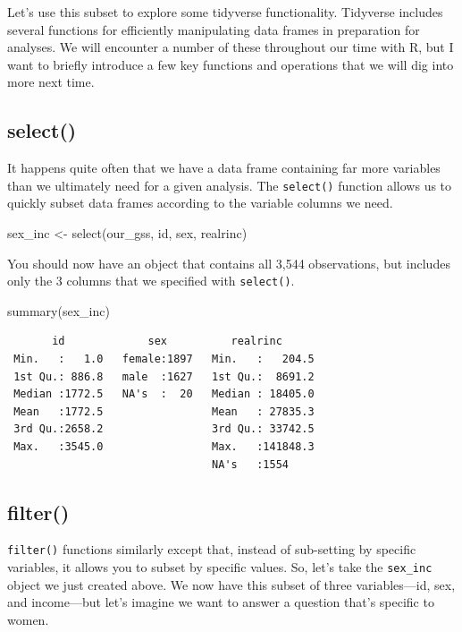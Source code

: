 \documentclass[
  letterpaper,
  DIV=11,
  numbers=noendperiod]{scrreprt}
\newenvironment{Shaded}{\begin{snugshade}}{\end{snugshade}}
\newcommand{\FunctionTok}[1]{\textcolor[rgb]{0.28,0.35,0.67}{#1}}
\newcommand{\NormalTok}[1]{\textcolor[rgb]{0.00,0.23,0.31}{#1}}
\newcommand{\OtherTok}[1]{\textcolor[rgb]{0.00,0.23,0.31}{#1}}
\begin{document}
Let's use this subset to explore some tidyverse functionality. Tidyverse
includes several functions for efficiently manipulating data frames in
preparation for analyses. We will encounter a number of these throughout
our time with R, but I want to briefly introduce a few key functions and
operations that we will dig into more next time.

\subsection{select()}\label{select}

It happens quite often that we have a data frame containing far more
variables than we ultimately need for a given analysis. The
\texttt{select()} function allows us to quickly subset data frames
according to the variable columns we need.

\begin{Shaded}
\begin{Highlighting}[]
\NormalTok{sex\_inc }\OtherTok{\textless{}{-}} \FunctionTok{select}\NormalTok{(our\_gss, id, sex, realrinc)}
\end{Highlighting}
\end{Shaded}

You should now have an object that contains all 3,544 observations, but
includes only the 3 columns that we specified with \texttt{select()}.

\begin{Shaded}
\begin{Highlighting}[]
\FunctionTok{summary}\NormalTok{(sex\_inc)}
\end{Highlighting}
\end{Shaded}

\begin{verbatim}
       id             sex          realrinc       
 Min.   :   1.0   female:1897   Min.   :   204.5  
 1st Qu.: 886.8   male  :1627   1st Qu.:  8691.2  
 Median :1772.5   NA's  :  20   Median : 18405.0  
 Mean   :1772.5                 Mean   : 27835.3  
 3rd Qu.:2658.2                 3rd Qu.: 33742.5  
 Max.   :3545.0                 Max.   :141848.3  
                                NA's   :1554      
\end{verbatim}

\subsection{filter()}\label{filter}

\texttt{filter()} functions similarly except that, instead of
sub-setting by specific variables, it allows you to subset by specific
values. So, let's take the \texttt{sex\_inc} object we just created
above. We now have this subset of three variables---id, sex, and
income---but let's imagine we want to answer a question that's specific
to women.
\end{document}
